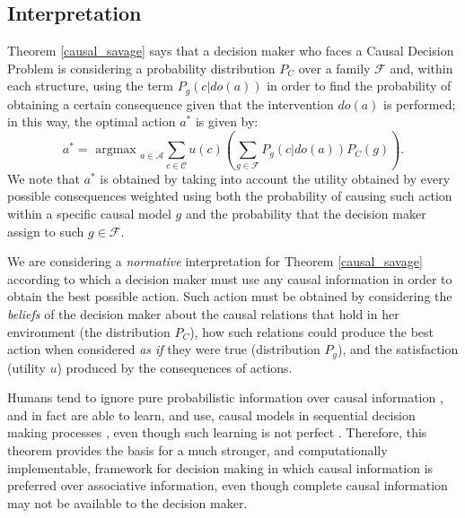 \documentclass{svjour3}                     %
\begin{document}
\subsection{Interpretation}
Theorem \ref{causal_savage} says that a decision maker who faces a Causal Decision Problem is considering a probability distribution $P_C$ over a family $\mathcal{F}$ and, within each structure, using the term $P_g(c|do(a))$ in order to find the probability of obtaining a certain consequence given that the intervention $do(a)$ is performed; in this way, the optimal action $a^\ast$ is given by:
\begin{equation}
a^\ast = \textrm{ argmax }_{a \in \mathcal{A}}  \sum_{c \in \mathcal{C}} u(c) \left( \sum_{g \in \mathcal{F}} P_g(c | do(a))P_C(g) \right). 
\end{equation}
We note that $a^\ast$ is obtained by taking into account the utility obtained by every possible consequences weighted using both the probability of causing such action within a specific causal model $g$ and the probability that the decision maker assign to such $g \in \mathcal{F}$.

We are considering a \textit{normative} interpretation for Theorem \ref{causal_savage} according to which a decision maker must use any causal information in order to obtain the best possible action. Such action must be obtained by considering the \textit{beliefs} of the decision maker about the causal relations that hold in her environment (the distribution $P_C$), how such relations could produce the best action when considered \textit{as if} they were true (distribution $P_g$), and the satisfaction (utility $u$) produced by the consequences of actions.

Humans tend to ignore pure probabilistic information over causal information \citep{tversky1980causal}, and in fact are able to learn, and use, causal models in sequential decision making processes \citep{lagnado2007beyond,sloman2006causal,nichols2007decision,meder2010observing,hagmayer2013repeated,wellen2012learning}, even though such learning is not perfect \citep{rottman2014reasoning}. Therefore, this theorem provides the basis for a much stronger, and computationally implementable, framework for decision making in which causal information is preferred over associative information, even though complete causal information may not be available to the decision maker.
\end{document}
